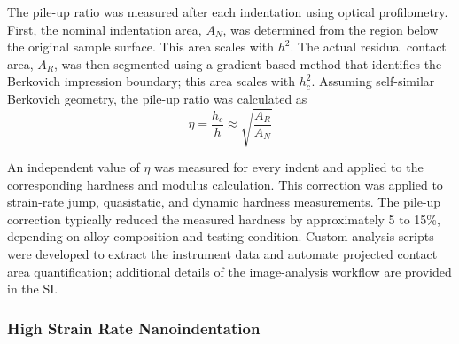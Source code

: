 \documentclass[preprint,12pt,times]{elsarticle}  %
\begin{document}
The pile-up ratio was measured after each indentation using optical profilometry. First, the nominal indentation area, $A_N$, was determined from the region below the original sample surface. This area scales with $h^2$. The actual residual contact area, $A_R$, was then segmented using a gradient-based method that identifies the Berkovich impression boundary; this area scales with $h_c^2$. Assuming self-similar Berkovich geometry, the pile-up ratio was calculated as
\[
\eta = \frac{h_c}{h} \approx \sqrt{\frac{A_R}{A_N}}
\]

An independent value of $\eta$ was measured for every indent and applied to the corresponding hardness and modulus calculation. This correction was applied to strain-rate jump, quasistatic, and dynamic hardness measurements. The pile-up correction typically reduced the measured hardness by approximately 5 to 15\%, depending on alloy composition and testing condition. Custom analysis scripts were developed to extract the instrument data and automate projected contact area quantification; additional details of the image-analysis workflow are provided in the SI.



\subsubsection{High Strain Rate Nanoindentation}



\end{document}
